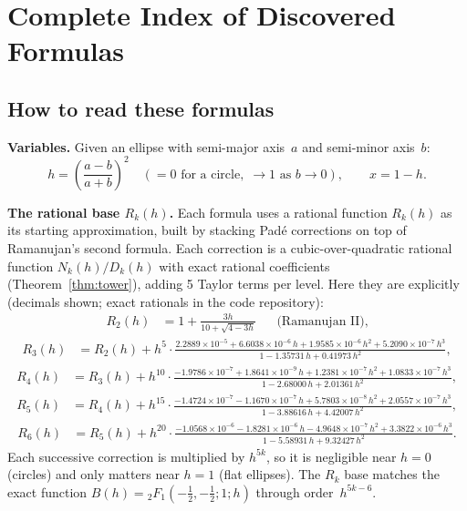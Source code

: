 \documentclass[12pt]{article}
\begin{document}
\section{Complete Index of Discovered Formulas}\label{app:complete-index}

\subsection*{How to read these formulas}

\noindent\textbf{Variables.} Given an ellipse with semi-major axis~$a$ and semi-minor axis~$b$:
\[
h = \left(\frac{a-b}{a+b}\right)^{\!2} \quad (= 0 \text{ for a circle},\; \to 1 \text{ as } b \to 0), \qquad x = 1-h.
\]

\noindent\textbf{The rational base $R_k(h)$.} Each formula uses a rational function $R_k(h)$ as its starting approximation, built by stacking Pad\'e corrections on top of Ramanujan's second formula. Each correction is a cubic-over-quadratic rational function $N_k(h)/D_k(h)$ with exact rational coefficients (Theorem~\ref{thm:tower}), adding 5 Taylor terms per level.  Here they are explicitly (decimals shown; exact rationals in the code repository):
\begin{align*}
R_2(h) &= 1 + \frac{3h}{10 + \sqrt{4-3h}} & &\text{(Ramanujan II)},
\end{align*}
\begin{align*}
R_3(h) &= R_2(h) + h^5 \cdot \frac{2.2889{\times}10^{-5} + 6.6038{\times}10^{-6}\,h + 1.9585{\times}10^{-6}\,h^2 + 5.2090{\times}10^{-7}\,h^3}{1 - 1.35731\,h + 0.41973\,h^2},
\end{align*}
\begin{align*}
R_4(h) &= R_3(h) + h^{10} \cdot \frac{-1.9786{\times}10^{-7} + 1.8641{\times}10^{-9}\,h + 1.2381{\times}10^{-7}\,h^2 + 1.0833{\times}10^{-7}\,h^3}{1 - 2.68000\,h + 2.01361\,h^2},
\end{align*}
\begin{align*}
R_5(h) &= R_4(h) + h^{15} \cdot \frac{-1.4724{\times}10^{-7} - 1.1670{\times}10^{-7}\,h + 5.7803{\times}10^{-8}\,h^2 + 2.0557{\times}10^{-7}\,h^3}{1 - 3.88616\,h + 4.42007\,h^2},
\end{align*}
\begin{align*}
R_6(h) &= R_5(h) + h^{20} \cdot \frac{-1.0568{\times}10^{-6} - 1.8281{\times}10^{-6}\,h - 4.9648{\times}10^{-7}\,h^2 + 3.3822{\times}10^{-6}\,h^3}{1 - 5.58931\,h + 9.32427\,h^2}.
\end{align*}
Each successive correction is multiplied by $h^{5k}$, so it is negligible near $h=0$ (circles) and only matters near $h=1$ (flat ellipses). The $R_k$ base matches the exact function $B(h) = {}_2F_1(-\tfrac12,-\tfrac12;1;h)$ through order~$h^{5k-6}$.
\end{document}
